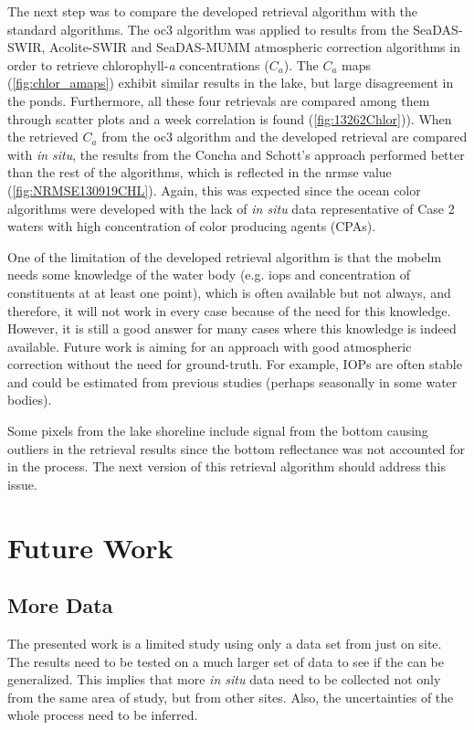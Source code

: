 The next step was to compare the developed retrieval algorithm with the standard algorithms. The \gls{oc3} algorithm was applied to results from the SeaDAS-SWIR, Acolite-SWIR and SeaDAS-MUMM atmospheric correction algorithms in order to retrieve chlorophyll-{\it a} concentrations ($C_a$). The $C_a$ maps (\autoref{fig:chlor_amaps}) exhibit similar results in the lake, but large disagreement in the ponds. Furthermore, all these four retrievals are compared among them through scatter plots and a week correlation is found (\autoref{fig:13262Chlor})). When the retrieved $C_a$ from the \gls{oc3} algorithm and the developed retrieval are compared with {\it in situ}, the results from the Concha and Schott's approach performed better than the rest of the algorithms, which is reflected in the \gls{nrmse} value (\autoref{fig:NRMSE130919CHL}). Again, this was expected since the ocean color algorithms were developed with the lack of {\it in situ} data representative of Case 2 waters with high concentration of color producing agents (CPAs).




One of the limitation of the developed retrieval algorithm is that the \gls{mobelm} needs some knowledge of the water body (e.g. \gls{iops} and concentration of constituents at at least one point), which is often available but not always, and therefore, it will not work in every case because of the need for this knowledge. However, it is still a good answer for many cases where this knowledge is indeed available. Future work is aiming for an approach with good atmospheric correction without the need for ground-truth. For example, IOPs are often stable and could be estimated from previous studies (perhaps seasonally in some water bodies).

Some pixels from the lake shoreline include signal from the bottom causing outliers in the retrieval results since the bottom reflectance was not accounted for in the process. The next version of this retrieval algorithm should address this issue. 

\section{Future Work}
\label{sec:futurework}
\subsection{More Data} 
The presented work is a limited study using only a data set from just on site. The results need to be tested on a much larger set of data to see if the can be generalized. This implies that more {\it in situ} data need to be collected not only from the same area of study, but from other sites. Also, the uncertainties of the whole process need to be inferred.

